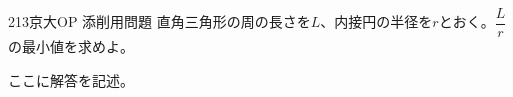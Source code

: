 \begin{thm}{213}{}{京大OP 添削用問題}
 直角三角形の周の長さを$L$、内接円の半径を$r$とおく。$\dfrac{L}{r}$の最小値を求めよ。
\end{thm}

ここに解答を記述。